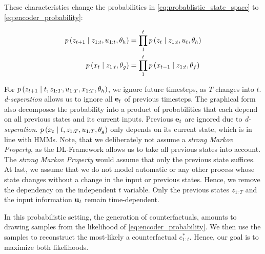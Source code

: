 \documentclass[./../../paper.tex]{subfiles}
\begin{document}


These characteristics change the probabilities in \autoref{eq:probablistic_state_space} to \autoref{eq:encoder_probability}:

\begin{align}
    \label{eq:encoder_probability}
    p\left(z_{t+1} \mid z_{1:t}, u_{1:t}, \theta_h\right)                   & =  \prod_{1}^{t} p\left(z_t \mid z_{1:t}, u_{t}, \theta_h\right) \\
    p\left(x_t \mid z_{1:t}, \theta_g\right)                   & = \prod_{1}^{t} p\left(x_{t-1} \mid z_{1:t},\theta_f\right)
\end{align}

For $p\left(z_{t+1} \mid t, z_{1:T}, u_{1:T}, x_{1:T}, \theta_h\right)$, we ignore future timesteps, as $T$ changes into $t$. \emph{d-seperation} allows us to ignore all $\mathbf{e}_t$ of previous timesteps. The graphical form also decomposes the probability into a product of probabilities that each depend on all previous states and its current inputs. Previous $\mathbf{e}_t$ are ignored due to \emph{d-seperation}. $p\left(x_t \mid t, z_{1:T}, u_{1:T}, \theta_g\right)$ only depends on its current state, which is in line with \glspl{HMM}.
Note, that we deliberately not assume a \emph{strong Markov Property}, as the \gls{DL}-Framework allows us to take all previous states into account. The \emph{strong Markov Property} would assume that only the previous state suffices. At last, we assume that we do not model automatic or any other process whose state changes without a change in the input or previous states. Hence, we remove the dependency on the independent $t$ variable. Only the previous states $z_{1:T}$ and the input information $\mathbf{u}_t$ remain time-dependent. 

In this probabilistic setting, the generation of counterfactuals, amounts to drawing samples from the likelihood of \autoref{eq:encoder_probability}. We then use the samples to reconstruct the most-likely a counterfactual $e_{1:t}^*$. Hence, our goal is to maximize both likelihoods. 

\end{document}

